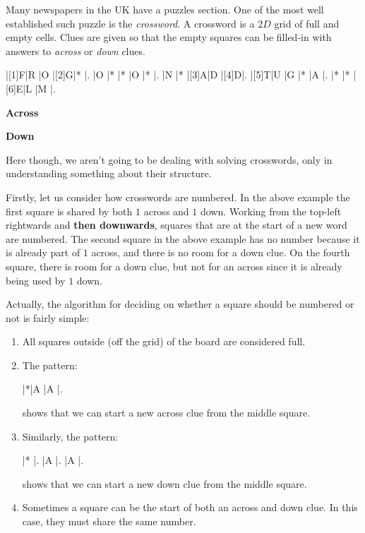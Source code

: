 Many newspapers in the UK have a puzzles section. One of the most well
established such puzzle is the {\em crossword}.
A crossword is a $2D$ grid of
full and empty cells. Clues are given so that the empty squares can be filled-in
with answers to {\em across} or {\em down} clues.

\begin{Puzzle}{5}{5}%
|[1]F|R |O   |[2]G|*   |.
|O   |* |*   |O   |*   |.
|N   |* |[3]A|D   |[4]D|.
|[5]T|U |G   |*   |A   |.
|*   |* |[6]E|L   |M   |.
\end{Puzzle}
\begin{PuzzleClues}{\textbf{Across}}
\end{PuzzleClues}
\begin{PuzzleClues}{\textbf{Down}}
\end{PuzzleClues}

\vspace*{1.5ex}
\noindent Here though, we aren't going to be dealing with solving crosswords, only in understanding
something about their structure.

\noindent Firstly, let us consider how crosswords are numbered.
In the above example the first square is shared by both $1$ across and $1$ down.
Working from the top-left rightwards and {\bf then downwards}, squares that are
at the start of a new word are numbered. The second square in the above example has no number
because it is already part of $1$ across, and there is no room for a down clue. 
On the fourth square, there is room for a down clue, but not for an across since it is already being used by $1$ down.

\noindent Actually, the algorithm for deciding on whether a square should be numbered or not is fairly simple:
\begin{enumerate}
\item All squares outside (off the grid) of the board are considered full.
\item The pattern:
\begin{Puzzle}{3}{1}%
|*|A |A |.
\end{Puzzle}
shows that we can start a new across clue from the middle square.
\item Similarly, the pattern:
\begin{Puzzle}{1}{3}%
|* |.
|A |.
|A |.
\end{Puzzle}
shows that we can start a new down clue from the middle square.
\item Sometimes a square can be the start of both an across and down clue.
In this case, they must share the same number.
\end{enumerate}


